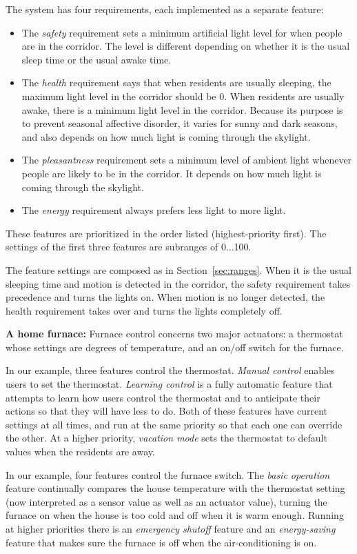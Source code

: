 \documentclass[conference]{IEEEtran}
\begin{document}
The system has four requirements, each implemented as a separate
feature:
\begin{itemize}
\item
The {\it safety} requirement sets a minimum artificial
light level for when people
are in the corridor.
The level is different depending on whether it is the usual sleep time
or the usual awake time.
\item
The {\it health} requirement says that when residents are usually
sleeping, the
maximum light level in the corridor should be 0.  
When residents are usually
awake, there is a minimum light level in the corridor.
Because its purpose is to prevent seasonal affective disorder,
it varies for sunny and dark seasons, and also depends on how much
light is coming through the skylight.
\item
The {\it pleasantness} requirement sets a minimum level of ambient
light whenever people are likely to be in the corridor.
It depends on how much light is coming through the skylight.
\item
The {\it energy} requirement always prefers less light to more light.
\end{itemize}
These features are prioritized in the order listed (highest-priority
first).
The settings of the first three features 
are subranges of 0...100.

The feature settings are composed as in Section~\ref{sec:ranges}.
When it is the usual sleeping time and motion is detected in the
corridor, the safety requirement takes precedence and turns the lights
on.
When motion is no longer detected, the health requirement takes over
and turns the lights completely off.

\vspace{2mm}
{\bf A home furnace:}
Furnace control concerns two major actuators: a thermostat whose settings
are degrees of temperature, and an on/off switch for the furnace.

In our example, three features control the thermostat.  
{\it Manual control} enables users to set the thermostat.
{\it Learning control} is a fully automatic feature that attempts to
learn how users control the thermostat and to anticipate their actions
so that they will have less to do.
Both of these features have current settings at all times, and run
at the same priority so that each one can override the other.
At a higher priority,
{\it vacation mode} sets the thermostat to default values when the
residents are away.

In our example, four features control the furnace switch.
The {\it basic operation}
feature continually compares the house temperature with the
thermostat setting (now interpreted as a sensor value as well as an
actuator value), turning the furnace on when the house is too cold and
off when it is warm enough.
Running at higher priorities there is an {\it emergency shutoff}
feature and an {\it energy-saving} feature that makes sure the furnace
is off when the air-conditioning is on.
\end{document}
